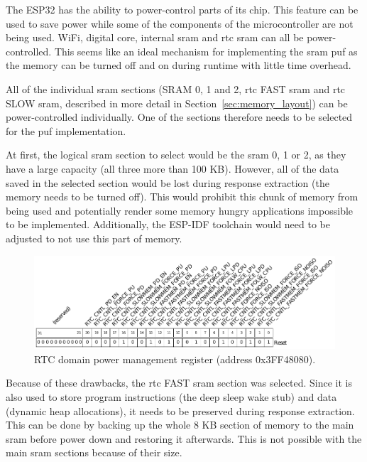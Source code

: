 The ESP32 has the ability to power-control parts of its chip. This feature can be used to save power while some of the components of the microcontroller are not being used. WiFi, digital core, internal \gls{sram} and \gls{rtc} \gls{sram} can all be power-controlled. This seems like an ideal mechanism for implementing the \gls{sram} \gls{puf} as the memory can be turned off and on during runtime with little time overhead.\cite{esp322021}

All of the individual \gls{sram} sections (SRAM 0, 1 and 2, \gls{rtc} FAST \gls{sram} and \gls{rtc} SLOW \gls{sram}, described in more detail in Section~\ref{sec:memory_layout}) can be power-controlled individually. One of the sections therefore needs to be selected for the \gls{puf} implementation.

At first, the logical \gls{sram} section to select would be the \gls{sram} 0, 1 or 2, as they have a large capacity (all three more than 100 KB). However, all of the data saved in the selected section would be lost during response extraction (the memory needs to be turned off). This would prohibit this chunk of memory from being used and potentially render some memory hungry applications impossible to be implemented. Additionally, the ESP-IDF toolchain would need to be adjusted to not use this part of memory. 

\begin{figure}[ht!]
    \centering
    \captionsetup{justification=centering,margin=0.5cm}
    \includegraphics[width=\textwidth]{images/rtc_register.pdf}
    \caption[RTC domain power management register (address 0x3FF48080).]{RTC domain power management register (address 0x3FF48080).\cite{esp322021}}
    \label{fig:rtc_register}
\end{figure}

Because of these drawbacks, the \gls{rtc} FAST \gls{sram} section was selected. Since it is also used to store program instructions (the deep sleep wake stub) and data (dynamic heap allocations), it needs to be preserved during response extraction. This can be done by backing up the whole 8 KB section of memory to the main \gls{sram} before power down and restoring it afterwards. This is not possible with the main \gls{sram} sections because of their size.

